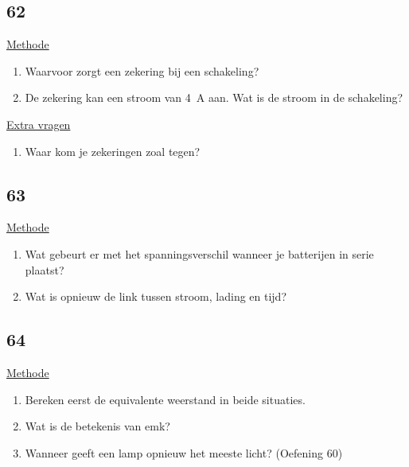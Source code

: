 \subsection*{62}
\underline{Methode}
\begin{enumerate}
	\item Waarvoor zorgt een zekering bij een schakeling?
	\item De zekering kan een stroom van 4~A aan. Wat is de stroom in de schakeling?
\end{enumerate}

\underline{Extra vragen}
\begin{enumerate}
	\item Waar kom je zekeringen zoal tegen?
\end{enumerate}




\subsection*{63}
\underline{Methode}
\begin{enumerate}
	\item Wat gebeurt er met het spanningsverschil wanneer je batterijen in serie plaatst?
	\item Wat is opnieuw de link tussen stroom, lading en tijd? 
\end{enumerate}





\subsection*{64}
\underline{Methode}
\begin{enumerate}
	\item Bereken eerst de equivalente weerstand in beide situaties.
	\item Wat is de betekenis van emk?
	\item Wanneer geeft een lamp opnieuw het meeste licht? (Oefening 60)
\end{enumerate}












